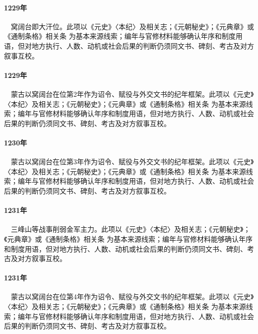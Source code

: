 \paragraph{1229年}　窝阔台即大汗位。此项以《元史》〈本纪〉及相关志；《元朝秘史》；《元典章》或《通制条格》相关条 为基本来源线索；编年与官修材料能够确认年序和制度用语，但对地方执行、人数、动机或社会后果的判断仍须同文书、碑刻、考古及对方叙事互校。

\paragraph{1229年}　蒙古以窝阔台在位第2年作为诏令、赋役与外交文书的纪年框架。此项以《元史》〈本纪〉及相关志；《元朝秘史》；《元典章》或《通制条格》相关条 为基本来源线索；编年与官修材料能够确认年序和制度用语，但对地方执行、人数、动机或社会后果的判断仍须同文书、碑刻、考古及对方叙事互校。

\paragraph{1230年}　蒙古以窝阔台在位第3年作为诏令、赋役与外交文书的纪年框架。此项以《元史》〈本纪〉及相关志；《元朝秘史》；《元典章》或《通制条格》相关条 为基本来源线索；编年与官修材料能够确认年序和制度用语，但对地方执行、人数、动机或社会后果的判断仍须同文书、碑刻、考古及对方叙事互校。

\paragraph{1231年}　三峰山等战事削弱金军主力。此项以《元史》〈本纪〉及相关志；《元朝秘史》；《元典章》或《通制条格》相关条 为基本来源线索；编年与官修材料能够确认年序和制度用语，但对地方执行、人数、动机或社会后果的判断仍须同文书、碑刻、考古及对方叙事互校。

\paragraph{1231年}　蒙古以窝阔台在位第4年作为诏令、赋役与外交文书的纪年框架。此项以《元史》〈本纪〉及相关志；《元朝秘史》；《元典章》或《通制条格》相关条 为基本来源线索；编年与官修材料能够确认年序和制度用语，但对地方执行、人数、动机或社会后果的判断仍须同文书、碑刻、考古及对方叙事互校。

